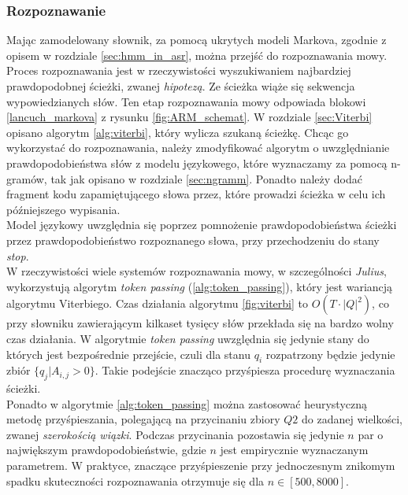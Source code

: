 \documentclass[11pt]{article}
\newcommand{\refBlock}[1]{
	\hyperref[#1]{\ref*{#1}}
}
\begin{document}
	   \subsubsection{ Rozpoznawanie}
		   \label{sec:recognition}
		   Mając zamodelowany słownik, za pomocą ukrytych modeli Markova, zgodnie z opisem w rozdziale \ref{sec:hmm_in_asr}, można przejść do rozpoznawania mowy. Proces rozpoznawania jest w rzeczywistości wyszukiwaniem najbardziej prawdopodobnej ścieżki, zwanej \textit{hipotezą}. Ze ścieżka wiąże się sekwencja wypowiedzianych słów. Ten etap rozpoznawania mowy odpowiada blokowi \refBlock{lancuch_markova} z rysunku \ref{fig:ARM_schemat}. W rozdziale \ref{sec:Viterbi} opisano algorytm \ref{alg:viterbi}, który wylicza szukaną ścieżkę. Chcąc go wykorzystać do rozpoznawania, należy zmodyfikować algorytm o uwzględnianie prawdopodobieństwa słów z modelu językowego, które wyznaczamy za pomocą n-gramów, tak jak opisano w rozdziale \ref{sec:ngramm}. Ponadto należy dodać fragment kodu zapamiętującego słowa przez, które prowadzi ścieżka w celu ich późniejszego wypisania.\\
		   Model językowy uwzględnia się poprzez pomnożenie prawdopodobieństwa ścieżki przez prawdopodobieństwo rozpoznanego słowa, przy przechodzeniu do stany \textit{stop}.\\
		   W rzeczywistości wiele systemów rozpoznawania mowy, w szczególności \textit{Julius}, wykorzystują algorytm \textit{token passing} (\ref{alg:token_passing}), który jest wariancją algorytmu Viterbiego. Czas działania algorytmu \ref{fig:viterbi} to $O(T\cdot |Q|^2)$, co przy słowniku zawierającym kilkaset tysięcy słów przekłada się na bardzo wolny czas działania. W algorytmie \textit{token passing} uwzględnia się jedynie stany do których jest bezpośrednie przejście, czuli dla stanu $q_i$ rozpatrzony będzie jedynie zbiór $\{q_j |  A_{i,j}>0 \}$. Takie podejście znacząco przyśpiesza procedurę wyznaczania ścieżki. \\
		   Ponadto w algorytmie \ref{alg:token_passing} można zastosować heurystyczną metodę przyśpieszania, polegającą na przycinaniu zbiory $Q2$ do zadanej wielkości, zwanej \textit{szerokością wiązki}. Podczas przycinania pozostawia się jedynie $n$ par o największym prawdopodobieństwie, gdzie $n$ jest empirycznie wyznaczanym parametrem. W praktyce, znaczące przyśpieszenie przy jednoczesnym znikomym spadku skuteczności rozpoznawania otrzymuje się dla $n \in [500, 8000]$.
		    
\end{document}
